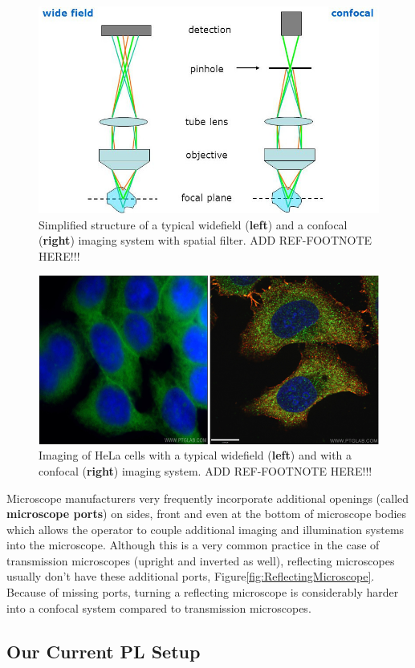\begin{figure}[H]
	\centering
	\includegraphics[angle=0,origin=c,width = 1.0\linewidth]{Section_Microscope/Figures/Confocal_microscopy_Basic_principle1.jpg}
	\caption{Simplified structure of a typical widefield (\textbf{left}) and a confocal (\textbf{right})
		imaging system  with spatial filter. ADD REF-FOOTNOTE HERE!!!}
	\label{fig:WidefieldVsConfocal}
\end{figure}

\begin{figure}[H]
	\centering
	\includegraphics[angle=0,origin=c,width = 1.0\linewidth]{Section_Microscope/Figures/EpiVsConfocal1.png}
	\caption{Imaging of HeLa cells with a typical widefield (\textbf{left}) and with a confocal 
		(\textbf{right}) imaging system. ADD REF-FOOTNOTE HERE!!!}
	\label{fig:WidefieldVsConfocalResolution}
\end{figure}

Microscope manufacturers very frequently incorporate additional openings (called \textbf{microscope ports})
on sides, front and even at the bottom of microscope bodies which allows the operator to 
couple additional imaging and illumination systems into the microscope. Although this is 
a very common practice in the case of transmission microscopes (upright and inverted as well),
reflecting microscopes usually don't have these additional ports, Figure\ref{fig:ReflectingMicroscope}. 
Because of missing ports, turning a reflecting microscope is considerably harder into 
a confocal system compared to transmission microscopes. 

\subsection{Our Current PL Setup}
